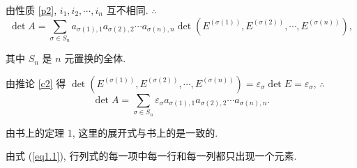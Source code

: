 \documentclass{ctexart}
\begin{document}
由性质 \ref{p2}, $i_1,i_2,\cdots,i_n$ 互不相同. $\therefore$
\[\det A=\sum\limits_{\sigma\in S_n}a_{\sigma(1),1}a_{\sigma(2),2}\cdots a_{\sigma(n),n}\det\left(E^{(\sigma(1))},E^{(\sigma(2))},\cdots,E^{(\sigma(n))}\right),\]

其中 $S_n$ 是 $n$ 元置换的全体.

由推论 \ref{c2} 得 $\det\left(E^{(\sigma(1))},E^{(\sigma(2))},\cdots,E^{(\sigma(n))}\right)=\varepsilon_\sigma\det E=\varepsilon_\sigma$, $\therefore$
\begin{equation}\label{eq1.1}
    \det A=\sum\limits_{\sigma\in S_n}\varepsilon_\sigma a_{\sigma(1),1}a_{\sigma(2),2}\cdots a_{\sigma(n),n}.
\end{equation}

由书上的定理 1, 这里的展开式与书上的是一致的.

由式 (\ref{eq1.1}), 行列式的每一项中每一行和每一列都只出现一个元素.
\end{document}

